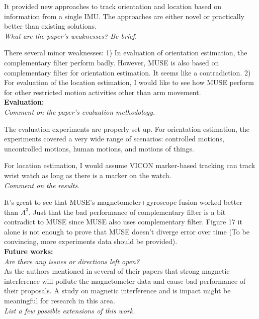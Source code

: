 \documentclass[11pt, oneside]{article}   	%
\begin{document}
It provided new approaches to track orientation and location based on information from a single IMU. The approaches are either novel or practically better than existing solutions.
\\

\noindent \emph{What are the paper's weaknesses? Be brief.}

There several minor weaknesses: 1)  In evaluation of orientation estimation, the complementary filter perform badly. However, MUSE is also based on complementary filter for orientation estimation. It seems like a contradiction. 2) For evaluation of the location estimation, I would like to see how MUSE perform for other restricted motion activities other than arm movement.\\

\noindent \textbf{Evaluation:}\\
\emph{Comment on the paper's evaluation methodology.}

The evaluation experiments are properly set up. For orientation estimation, the experiments covered a very wide range of scenarios: controlled motions, uncontrolled motions, human motions, and motions of things. 

For location estimation, I would assume VICON marker-based tracking can track wrist watch as long as there is a marker on the watch. \\

\noindent \emph{Comment on the results.}

It's great to see that MUSE's magnetometer+gyroscope fusion worked better than $A^3$. Just that the bad performance of complementary filter is a bit contradict to MUSE since MUSE also uses complementary filter. Figure 17 it alone is not enough to prove that MUSE doesn't diverge error over time (To be convincing, more experiments data should be provided). \\

\noindent \textbf{Future works:}\\
\emph{Are there any issues or directions left open?}\\

As the authors mentioned in several of their papers that strong magnetic interference will pollute the magnetometer data and cause bad performance of their proposals. A study on magnetic interference and is impact might be meaningful for research in this area.\\

\noindent \emph{List a few possible extensions of this work.}
\end{document}
